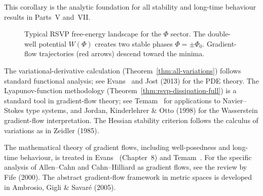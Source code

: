 This corollary is the analytic foundation for all stability
and long-time behaviour results in Parts~V and~VII\@.


\begin{figure}[ht]
\centering
{}
\caption{Typical RSVP free-energy landscape for the $\Phi$ sector.
         The double-well potential $W(\Phi)$ creates two stable
         phases $\Phi = \pm\Phi_0$.
         Gradient-flow trajectories (red arrows) descend toward
         the minima.}
\label{fig:rsvp-energy-landscape}
\end{figure}

\begin{CitationAnchor}
  The variational-derivative calculation
  (Theorem~\ref{thm:all-variations}) follows standard
  functional analysis; see Evans~\cite{evans2010} and
  Jost (2013) for the PDE theory.
  The Lyapunov-function methodology (Theorem~\ref{thm:rsvp-dissipation-full})
  is a standard tool in gradient-flow theory; see
  Temam~\cite{temam2001} for applications to
  Navier--Stokes type systems, and Jordan, Kinderlehrer \& Otto
  (1998) for the Wasserstein gradient-flow interpretation.
  The Hessian stability criterion follows the calculus of
  variations as in Zeidler (1985).
\end{CitationAnchor}

\begin{FurtherReading}
  The mathematical theory of gradient flows, including
  well-posedness and long-time behaviour, is treated in
  Evans~\cite{evans2010} (Chapter~8) and Temam~\cite{temam2001}.
  For the specific analysis of Allen--Cahn and Cahn--Hilliard
  as gradient flows, see the review by Fife (2000).
  The abstract gradient-flow framework in metric spaces
  is developed in Ambrosio, Gigli \& Savaré (2005).
\end{FurtherReading}
